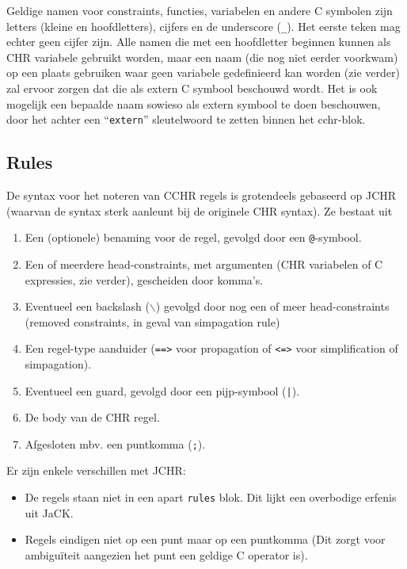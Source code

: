 Geldige namen voor constraints, functies, variabelen en andere C symbolen zijn letters (kleine en hoofdletters), cijfers
en de underscore ({\tt \_}). Het eerste teken mag echter geen cijfer zijn. Alle namen die met een hoofdletter beginnen
kunnen als CHR variabele gebruikt worden, maar een naam (die nog niet eerder voorkwam) op een plaats gebruiken waar geen
variabele gedefinieerd kan worden (zie verder) zal ervoor zorgen dat die als extern C symbool beschouwd wordt. Het is ook
mogelijk een bepaalde naam sowieso als extern symbool te doen beschouwen, door het achter een ``{\tt extern}'' sleutelwoord
te zetten binnen het cchr-blok.

\subsection{Rules}

De syntax voor het noteren van CCHR regels is grotendeels gebaseerd op JCHR (waarvan de syntax sterk aanleunt bij de
originele CHR syntax). Ze bestaat uit \begin{enumerate}
  \item Een (optionele) benaming voor de regel, gevolgd door een {\tt @}-symbool.
  \item Een of meerdere head-constraints, met argumenten (CHR variabelen of C expressies, zie verder), gescheiden door komma's.
  \item Eventueel een backslash ({\tt $\backslash$}) gevolgd door nog een of meer head-constraints (removed constraints, in geval van simpagation rule)
  \item Een regel-type aanduider ({\tt ==>} voor propagation of {\tt <=>} voor simplification of simpagation).
  \item Eventueel een guard, gevolgd door een pijp-symbool ({\tt |}).
  \item De body van de CHR regel.
  \item Afgesloten mbv. een puntkomma ({\tt ;}).
\end{enumerate}

Er zijn enkele verschillen met JCHR: \begin{itemize}
  \item De regels staan niet in een apart {\tt rules} blok. Dit lijkt een overbodige erfenis uit JaCK.
  \item Regels eindigen niet op een punt maar op een puntkomma (Dit zorgt voor ambigu\"iteit aangezien het punt een geldige
        C operator is).
\end{itemize}

